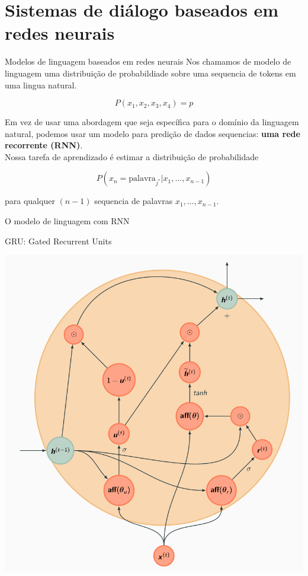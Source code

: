 \documentclass[10pt]{beamer}
\begin{document}
\section{Sistemas de diálogo baseados em redes neurais}

\begin{frame}{Modelos de linguagem baseados em redes neurais}
Nos chamamos de \alert{modelo de linguagem} uma distribuição de probabildiade sobre uma sequencia de tokens em uma lingua natural.

\[
P(x_1,x_2,x_3,x_4) = p
\]

Em vez de usar uma abordagem que seja específica para o domínio da linguagem natural, podemos usar um modelo para predição de dados sequencias:  \textbf{uma rede recorrente (RNN)}. \\

Nossa tarefa de aprendizado é estimar a distribuição de probabilidade

\[
P(x_{n} = \text{palavra}_{j^{*}} | x_{1}, \dots ,x_{n-1})
\]

para qualquer $(n-1)$ sequencia de palavras $x_{1}, \dots ,x_{n-1}$.

\end{frame}

\begin{frame}{O modelo de linguagem com RNN}

\end{frame}



\begin{frame}{GRU: Gated Recurrent Units}
\begin{center}
\includegraphics[scale=0.25]{images/gru.png}
\end{center}
\end{frame}
\end{document}
